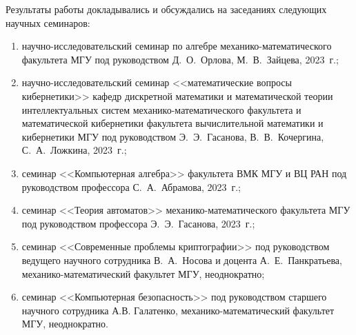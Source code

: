 Результаты работы докладывались и обсуждались на заседаниях следующих научных семинаров:
\begin{enumerate}    
    \item научно-исследовательский семинар по алгебре механико-математического факультета МГУ под руководством Д.~О.~Орлова, М.~В.~Зайцева, 2023~г.;

    \item научно-исследовательский семинар <<математические вопросы кибернетики>> кафедр дискретной математики и математической теории интеллектуальных систем механико-математического факультета и математической кибернетики факультета вычислительной математики и кибернетики МГУ под руководством Э.~Э.~Гасанова, В.~В.~Кочергина, С.~А.~Ложкина, 2023~г.;

    \item семинар <<Компьютерная алгебра>> факультета ВМК МГУ и ВЦ РАН под руководством профессора С.~А.~Абрамова, 2023~г.;

    \item семинар <<Теория автоматов>> механико-математического факультета МГУ под руководством профессора Э.~Э.~Гасанова, 2023~г.;

    \item семинар <<Современные проблемы криптографии>> под руководством ведущего научного сотрудника В.~А.~Носова и доцента А.~Е.~Панкратьева, механико-математический факультет МГУ, неоднократно;

    \item семинар <<Компьютерная безопасность>> под руководством старшего научного сотрудника А.В. Галатенко, механико-математический факультет МГУ, неоднократно.
\end{enumerate}


